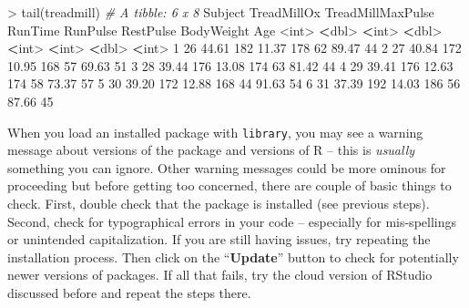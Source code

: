 \documentclass[
]{book}
\newenvironment{Shaded}{\begin{snugshade}}{\end{snugshade}}
\newcommand{\CommentTok}[1]{\textcolor[rgb]{0.56,0.35,0.01}{\textit{#1}}}
\newcommand{\DecValTok}[1]{\textcolor[rgb]{0.00,0.00,0.81}{#1}}
\newcommand{\ErrorTok}[1]{\textcolor[rgb]{0.64,0.00,0.00}{\textbf{#1}}}
\newcommand{\FloatTok}[1]{\textcolor[rgb]{0.00,0.00,0.81}{#1}}
\newcommand{\FunctionTok}[1]{\textcolor[rgb]{0.00,0.00,0.00}{#1}}
\newcommand{\NormalTok}[1]{#1}
\newcommand{\SpecialCharTok}[1]{\textcolor[rgb]{0.00,0.00,0.00}{#1}}
\begin{document}
\begin{Shaded}
\begin{Highlighting}[]
\SpecialCharTok{\textgreater{}} \FunctionTok{tail}\NormalTok{(treadmill)}
\CommentTok{\# A tibble: 6 x 8}
\NormalTok{  Subject TreadMillOx TreadMillMaxPulse RunTime RunPulse RestPulse BodyWeight   Age}
    \SpecialCharTok{\textless{}}\NormalTok{int}\SpecialCharTok{\textgreater{}}       \ErrorTok{\textless{}}\NormalTok{dbl}\SpecialCharTok{\textgreater{}}             \ErrorTok{\textless{}}\NormalTok{int}\SpecialCharTok{\textgreater{}}   \ErrorTok{\textless{}}\NormalTok{dbl}\SpecialCharTok{\textgreater{}}    \ErrorTok{\textless{}}\NormalTok{int}\SpecialCharTok{\textgreater{}}     \ErrorTok{\textless{}}\NormalTok{int}\SpecialCharTok{\textgreater{}}      \ErrorTok{\textless{}}\NormalTok{dbl}\SpecialCharTok{\textgreater{}} \ErrorTok{\textless{}}\NormalTok{int}\SpecialCharTok{\textgreater{}}
\DecValTok{1}      \DecValTok{26}       \FloatTok{44.61}               \DecValTok{182}   \FloatTok{11.37}      \DecValTok{178}        \DecValTok{62}      \FloatTok{89.47}    \DecValTok{44}
\DecValTok{2}      \DecValTok{27}       \FloatTok{40.84}               \DecValTok{172}   \FloatTok{10.95}      \DecValTok{168}        \DecValTok{57}      \FloatTok{69.63}    \DecValTok{51}
\DecValTok{3}      \DecValTok{28}       \FloatTok{39.44}               \DecValTok{176}   \FloatTok{13.08}      \DecValTok{174}        \DecValTok{63}      \FloatTok{81.42}    \DecValTok{44}
\DecValTok{4}      \DecValTok{29}       \FloatTok{39.41}               \DecValTok{176}   \FloatTok{12.63}      \DecValTok{174}        \DecValTok{58}      \FloatTok{73.37}    \DecValTok{57}
\DecValTok{5}      \DecValTok{30}       \FloatTok{39.20}               \DecValTok{172}   \FloatTok{12.88}      \DecValTok{168}        \DecValTok{44}      \FloatTok{91.63}    \DecValTok{54}
\DecValTok{6}      \DecValTok{31}       \FloatTok{37.39}               \DecValTok{192}   \FloatTok{14.03}      \DecValTok{186}        \DecValTok{56}      \FloatTok{87.66}    \DecValTok{45}
\end{Highlighting}
\end{Shaded}

\normalsize

\newpage

\indent When you load an installed package with \texttt{library}, you may see a warning message about versions of the package and versions of
R -- this is \emph{usually} something you can ignore. Other warning messages could
be more ominous for proceeding but before getting too concerned, there are
couple of basic things to check.
First, double check that the package is
installed (see
previous steps). Second, check for typographical errors in your code --
especially for mis-spellings or unintended capitalization. If you are still
having issues, try repeating the installation process. Then click on the ``\textbf{Update}'' button to check for potentially newer versions of packages. If all that fails, try the cloud version of RStudio discussed before and repeat the steps there.
\end{document}
